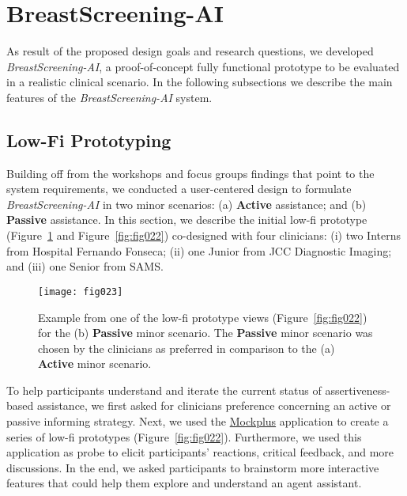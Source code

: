 \section{BreastScreening-AI}
\label{sec:sec006}

As result of the proposed design goals and research questions, we developed {\it BreastScreening-AI}, a proof-of-concept fully functional prototype to be evaluated in a realistic clinical scenario.
In the following subsections we describe the main features of the {\it BreastScreening-AI} system.

\subsection{Low-Fi Prototyping}
\label{sec:sec00601}

Building off from the workshops and focus groups findings that point to the system requirements, we conducted a user-centered design to formulate {\it BreastScreening-AI} in two minor scenarios:
(a) {\bf Active} assistance; and
(b) {\bf Passive} assistance.
In this section, we describe the initial low-fi prototype (Figure~\ref{fig:fig023} and Figure~\ref{fig:fig022}) co-designed with four clinicians:
(i) two Interns from Hospital Fernando Fonseca;
(ii) one Junior from JCC Diagnostic Imaging; and
(iii) one Senior from SAMS.

\begin{figure}[htbp]
\centering
\texttt{[image: fig023]}
\caption{Example from one of the low-fi prototype views (Figure~\ref{fig:fig022}) for the (b) {\bf Passive} minor scenario. The {\bf Passive} minor scenario was chosen by the clinicians as preferred in comparison to the (a) {\bf Active} minor scenario.}
\label{fig:fig023}
\end{figure}

To help participants understand and iterate the current status of assertiveness-based assistance, we first asked for clinicians preference concerning an active or passive informing strategy.
Next, we used the \hyperlink{https://www.mockplus.com}{Mockplus} application to create a series of low-fi prototypes (Figure~\ref{fig:fig022}).
Furthermore, we used this application as probe to elicit participants' reactions, critical feedback, and more discussions.
In the end, we asked participants to brainstorm more interactive features that could help them explore and understand an agent assistant.

